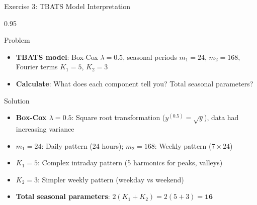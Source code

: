 \documentclass[9pt, aspectratio=169, t]{beamer}
\begin{document}
\begin{frame}{Exercise 3: TBATS Model Interpretation}
    \begin{cminipage}{0.95\textwidth}
    \begin{alertblock}{Problem}
        \begin{itemize}\setlength{\itemsep}{0pt}
            \item \textbf{TBATS model}: Box-Cox $\lambda = 0.5$, seasonal periods $m_1 = 24$, $m_2 = 168$, Fourier terms $K_1 = 5$, $K_2 = 3$
            \item \textbf{Calculate}: What does each component tell you? Total seasonal parameters?
        \end{itemize}
    \end{alertblock}

    \vspace{0.2cm}
    \begin{exampleblock}{Solution}
        \begin{itemize}\setlength{\itemsep}{0pt}
            \item \textbf{Box-Cox $\lambda = 0.5$}: Square root transformation ($y^{(0.5)} = \sqrt{y}$), data had increasing variance
            \item \textbf{$m_1 = 24$}: Daily pattern (24 hours); \textbf{$m_2 = 168$}: Weekly pattern ($7 \times 24$)
            \item \textbf{$K_1 = 5$}: Complex intraday pattern (5 harmonics for peaks, valleys)
            \item \textbf{$K_2 = 3$}: Simpler weekly pattern (weekday vs weekend)
            \item \textbf{Total seasonal parameters}: $2(K_1 + K_2) = 2(5+3) = \textbf{16}$
        \end{itemize}
    \end{exampleblock}
    \end{cminipage}
\end{frame}
\end{document}
